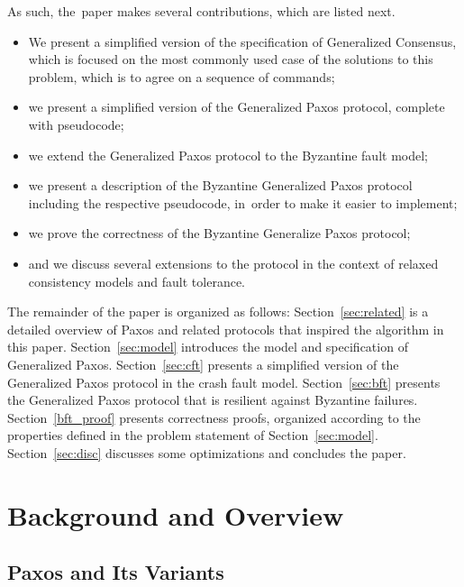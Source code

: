 \documentclass[algorithms,article,accept,moreauthors,pdftex,10pt,a4paper]{Definitions/mdpi}
\begin{document}
As such, the~paper makes several contributions, which are listed next.
%
\begin{itemize}
\item
We present a simplified version of the specification of Generalized
Consensus, which is focused on the most commonly used case of the
solutions to this problem, which is to agree on a sequence of
commands;

\item 
we present a simplified version of the Generalized Paxos protocol, complete with pseudocode;

\item
we extend the Generalized Paxos protocol to the Byzantine fault model; 

\item
we present a description of the Byzantine Generalized Paxos protocol
including the respective pseudocode, in~order to make it easier to implement;

\item
we prove the correctness of the Byzantine Generalize Paxos protocol;

\item
and we discuss several extensions to the protocol in the context of relaxed consistency models and fault tolerance.

\end{itemize}

The remainder of the paper is organized as follows: 
Section~\ref{sec:related} is a detailed overview of Paxos and related protocols that inspired the algorithm in this paper.
Section~\ref{sec:model} introduces the model and specification of Generalized Paxos.
Section~\ref{sec:cft} presents a simplified version of the Generalized Paxos protocol in the crash fault model. Section~\ref{sec:bft} presents the Generalized Paxos protocol that is resilient against Byzantine failures. Section~\ref{bft_proof} presents correctness proofs, organized according to the properties defined in the problem statement of Section~\ref{sec:model}. Section~\ref{sec:disc} discusses some optimizations and concludes the paper.

%
\section{Background and Overview\label{sec:related} }
\unskip
\subsection{Paxos and Its Variants \label{Paxos}}
\unskip
\end{document}
